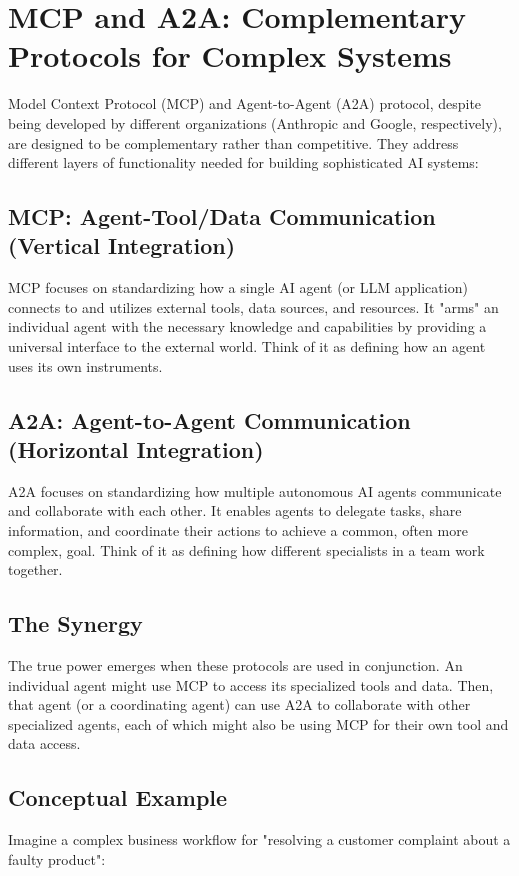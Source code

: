 \section{MCP and A2A: Complementary Protocols for Complex Systems}

Model Context Protocol (MCP) and Agent-to-Agent (A2A) protocol, despite being developed by different organizations (Anthropic and Google, respectively), 
are designed to be complementary rather than competitive. They address different layers of functionality needed for building sophisticated AI systems:

\subsection*{MCP: Agent-Tool/Data Communication (Vertical Integration)}
MCP focuses on standardizing how a single AI agent (or LLM application) connects to and utilizes external tools, data sources, and resources. 
It "arms" an individual agent with the necessary knowledge and capabilities by providing a universal interface to the external world. 
Think of it as defining how an agent uses its own instruments.

\subsection*{A2A: Agent-to-Agent Communication (Horizontal Integration)}
A2A focuses on standardizing how multiple autonomous AI agents communicate and collaborate with each other. It enables agents to 
delegate tasks, share information, and coordinate their actions to achieve a common, often more complex, goal. 
Think of it as defining how different specialists in a team work together.

\subsection*{The Synergy}
The true power emerges when these protocols are used in conjunction. An individual agent might use MCP to access its specialized tools and data. 
Then, that agent (or a coordinating agent) can use A2A to collaborate with other specialized agents, each of which might also be
 using MCP for their own tool and data access.

\subsection*{Conceptual Example}
Imagine a complex business workflow for "resolving a customer complaint about a faulty product":

